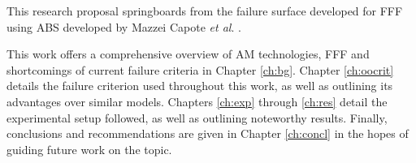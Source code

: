\documentclass[main.tex]{subfiles}
\begin{document}
This research proposal springboards from the failure surface developed for FFF using ABS developed by Mazzei Capote \emph{et al}. \cite{MazzeiCapote2019}.

This work offers a comprehensive overview of AM technologies, FFF and shortcomings of current failure criteria in Chapter \ref{ch:bg}. Chapter \ref{ch:oocrit} details the failure criterion used throughout this work, as well as outlining its advantages over similar models. Chapters \ref{ch:exp} through \ref{ch:res} detail the experimental setup followed, as well as outlining noteworthy results. Finally, conclusions and recommendations are given in Chapter \ref{ch:concl} in the hopes of guiding future work on the topic. %

% 
%
%
%
%
%
%
\end{document}
